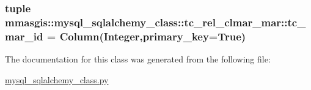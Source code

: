 \label{classmmasgis_1_1mysql__sqlalchemy__class_1_1tc__rel__clmar__mar_aa273ddf18bc5f0a576defcfc1f7f3f96}
\hypertarget{classmmasgis_1_1mysql__sqlalchemy__class_1_1tc__rel__clmar__mar_a6337cfd6a351c7e8c340ba3792c8f2e0}{
\subsubsection[{tc\_\-mar\_\-id}]{\setlength{\rightskip}{0pt plus 5cm}tuple {\bf mmasgis::mysql\_\-sqlalchemy\_\-class::tc\_\-rel\_\-clmar\_\-mar::tc\_\-mar\_\-id} = Column(Integer,primary\_\-key=True)}}
\label{classmmasgis_1_1mysql__sqlalchemy__class_1_1tc__rel__clmar__mar_a6337cfd6a351c7e8c340ba3792c8f2e0}


The documentation for this class was generated from the following file:\begin{DoxyCompactItemize}
\item 
\hyperlink{mysql__sqlalchemy__class_8py}{mysql\_\-sqlalchemy\_\-class.py}\end{DoxyCompactItemize}
